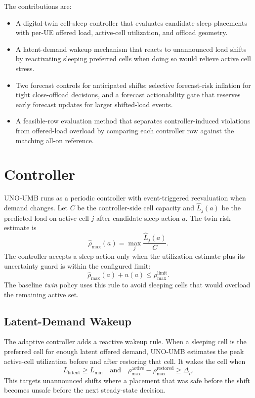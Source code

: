 \documentclass[10pt,twocolumn]{article}
\begin{document}
The contributions are:
\begin{itemize}
\item A digital-twin cell-sleep controller that evaluates candidate sleep
placements with per-UE offered load, active-cell utilization, and offload
geometry.
\item A latent-demand wakeup mechanism that reacts to unannounced load shifts
by reactivating sleeping preferred cells when doing so would relieve active
cell stress.
\item Two forecast controls for anticipated shifts: selective forecast-risk
inflation for tight close-offload decisions, and a forecast actionability gate
that reserves early forecast updates for larger shifted-load events.
\item A feasible-row evaluation method that separates controller-induced
violations from offered-load overload by comparing each controller row against
the matching all-on reference.
\end{itemize}

\section{Controller}

UNO-UMB runs as a periodic controller with event-triggered reevaluation when
demand changes.  Let $C$ be the controller-side cell capacity and
$\hat L_j(a)$ be the predicted load on active cell $j$ after candidate sleep
action $a$.  The twin risk estimate is
\begin{equation}
  \hat \rho_{\max}(a)=\max_j \frac{\hat L_j(a)}{C}.
\end{equation}
The controller accepts a sleep action only when the utilization estimate plus
its uncertainty guard is within the configured limit:
\begin{equation}
  \hat \rho_{\max}(a) + u(a) \leq \rho_{\max}^{\mathrm{limit}}.
\end{equation}
The baseline \emph{twin} policy uses this rule to avoid sleeping cells that
would overload the remaining active set.

\subsection{Latent-Demand Wakeup}

The adaptive controller adds a reactive wakeup rule.  When a sleeping cell is
the preferred cell for enough latent offered demand, UNO-UMB estimates the peak
active-cell utilization before and after restoring that cell.  It wakes the
cell when
\begin{equation}
  L_{\mathrm{latent}} \geq L_{\min}
  \quad\text{and}\quad
  \rho_{\max}^{\mathrm{active}}-\rho_{\max}^{\mathrm{restored}}\geq \Delta_\rho .
\end{equation}
This targets unannounced shifts where a placement that was safe before the
shift becomes unsafe before the next steady-state decision.
\end{document}
